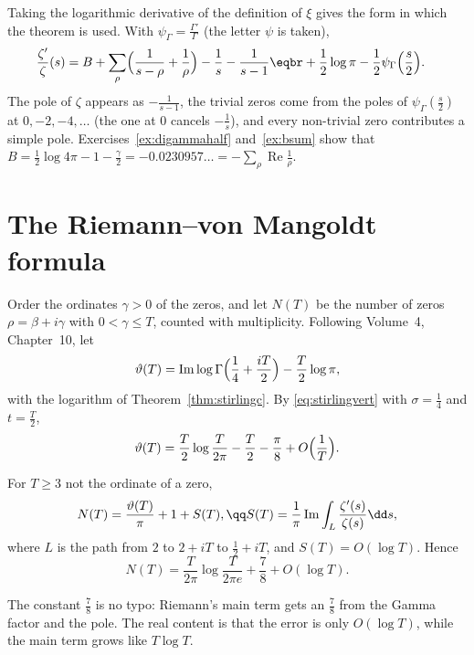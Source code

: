 Taking the logarithmic derivative of the definition of $\xi$ gives the form in which the theorem is used. With $\psi_\Gamma=\frac{\Gamma'}\Gamma$ (the letter $\psi$ is taken),
\begin{equation}\label{eq:zetapf}
\begin{aligned}\frac{\zeta'}\zeta(s)&=B+\sum_\rho\Bigl(\frac1{s-\rho}+\frac1\rho\Bigr)-\frac1s-\frac1{s-1}\eqbr+\frac12\log\pi-\frac12\psi_\Gamma\Bigl(\frac s2\Bigr).\end{aligned}
\end{equation}
The pole of $\zeta$ appears as $-\frac1{s-1}$, the trivial zeros come from the poles of $\psi_\Gamma(\frac s2)$ at $0,-2,-4,\dots$ (the one at $0$ cancels $-\frac1s$), and every non-trivial zero contributes
a simple pole. Exercises~\ref{ex:digammahalf} and~\ref{ex:bsum} show that $B=\frac12\log4\pi-1-\frac\gamma2=-0.0230957\ldots=-\sum_\rho\operatorname{Re}\frac1\rho$.

\section{The Riemann--von Mangoldt formula}

Order the ordinates $\gamma>0$ of the zeros, and let $N(T)$ be the number of zeros $\rho=\beta+i\gamma$ with $0<\gamma\le T$, counted with multiplicity. Following Volume~4, Chapter~10, let
\[
\vartheta(T)=\operatorname{Im}\log\Gamma\Bigl(\frac14+\frac{iT}2\Bigr)-\frac T2\log\pi,
\]
with the logarithm of Theorem~\ref{thm:stirlingc}. By \eqref{eq:stirlingvert} with $\sigma=\frac14$ and $t=\frac T2$,
\begin{equation}\label{eq:theta}
\vartheta(T)=\frac T2\log\frac T{2\pi}-\frac T2-\frac\pi8+O\Bigl(\frac1T\Bigr).
\end{equation}

\begin{theorem}\label{thm:rvm}
For $T\ge3$ not the ordinate of a zero,
\[
\begin{gathered}N(T)=\frac{\vartheta(T)}\pi+1+S(T),\qq S(T)=\frac1\pi\operatorname{Im}\int_L\frac{\zeta'(s)}{\zeta(s)}\dd s,\end{gathered}
\]
where $L$ is the path from $2$ to $2+iT$ to $\frac12+iT$, and $S(T)=O(\log T)$. Hence
\[
N(T)=\frac T{2\pi}\log\frac T{2\pi e}+\frac78+O(\log T).
\]
\end{theorem}

The constant $\frac78$ is no typo: Riemann's main term gets an $\frac78$ from the Gamma factor and the pole. The real content is that the error is only $O(\log T)$, while the main term
grows like $T\log T$.


